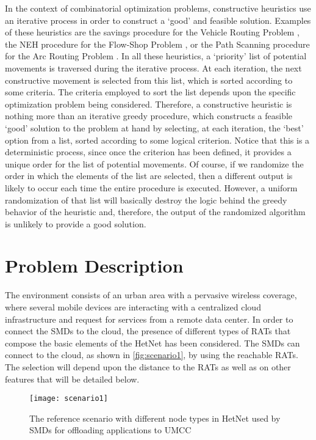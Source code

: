 \documentclass[twoside,openright]{report}
\begin{document}
In the context of combinatorial optimization problems, constructive heuristics use an iterative process in order to construct a `good' and feasible solution. Examples of these heuristics are the savings procedure for the Vehicle Routing Problem \cite{Clarke1964}, the NEH procedure for the Flow-Shop Problem \cite{Nawaz1983}, or the Path Scanning procedure for the Arc Routing Problem \cite{Golden1983}. 
In all these heuristics, a `priority' list of potential movements is traversed during the iterative process. 
At each iteration, the next constructive movement is selected from this list, which is sorted according to some criteria. 
The criteria employed to sort the list depends upon the specific optimization problem being considered. 
Therefore, a constructive heuristic is nothing more than an iterative greedy procedure, which constructs a feasible `good' solution to the problem at hand by selecting, at each iteration, the `best' option from a list, sorted according to some logical criterion. 
Notice that this is a deterministic process, since once the criterion has been defined, it provides a unique order for the list of potential movements. 
Of course, if we randomize the order in which the elements of the list are selected, then a different output is likely to occur each time the entire procedure is executed. 
However, a uniform randomization of that list will basically destroy the logic behind the greedy behavior of the heuristic and, therefore, the output of the randomized algorithm is unlikely to provide a good solution. 

\section{Problem Description}
\label{sec:problem_description}
The environment consists of an urban area with a pervasive wireless coverage, where several mobile devices are interacting with a centralized cloud infrastructure and request for services from a remote data center. 
In order to connect the \glspl{SMD} to the cloud, the presence of different types of \glspl{RAT} that compose the basic elements of the \gls{HetNet} has been considered. 
The \glspl{SMD} can connect to the cloud, as shown in \autoref{fig:scenario1}, by using the reachable \glspl{RAT}. 
The selection will depend upon the distance to the \glspl{RAT} as well as on other features that will be detailed below.
\begin{figure}[tbp]
\centering
\texttt{[image: scenario1]}
\caption{The reference scenario with different node types in HetNet used by SMDs for offloading applications to UMCC}
\label{fig:scenario1}
\end{figure}
\end{document}
